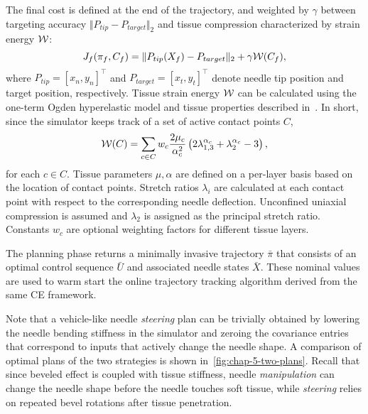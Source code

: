 The final cost is defined at the end of the trajectory, and weighted by $\gamma$ between targeting accuracy $\Vert P_{tip} - P_{target}\Vert_2$ and tissue compression characterized by strain energy $\mathcal{W}$:
\begin{equation}
  \label{eq:chap-5-plan-final-cost}
  J_{f}(\pi_f, C_f)= \Vert P_{tip}(X_f) - P_{target}\Vert_2 + \gamma\mathcal{W}(C_f),
\end{equation}
where $P_{tip} = [x_n, y_n]^{\top}$ and $P_{target} = [x_t, y_t]^{\top}$ denote needle tip position and target position, respectively. Tissue strain energy $\mathcal{W}$ can be calculated using the one-term Ogden hyperelastic model and tissue properties described in~\parencite{wangFlexibleNeedleBending2023}. In short, since the simulator keeps track of a set of active contact points $C$,
\begin{equation}
  \label{eq:chap-5-ogden}
  \mathcal{W}(C) = \sum_{c \in C}w_c \frac{2\mu_c}{\alpha_c^2}\left( 2\lambda_{1,3}^{\alpha_c} + \lambda_2^{\alpha_c} - 3 \right),
\end{equation}
for each $c \in C$. Tissue parameters $\mu, \alpha$ are defined on a per-layer basis based on the location of contact points. Stretch ratios $\lambda_i$ are calculated at each contact point with respect to the corresponding needle deflection. Unconfined uniaxial compression is assumed and $\lambda_2$ is assigned as the principal stretch ratio. Constants $w_c$ are optional weighting factors for different tissue layers. 

The planning phase returns a minimally invasive trajectory $\bar{\pi}$ that consists of an optimal control sequence $\bar{U}$ and associated needle states $\bar{X}$. These nominal values are used to warm start the online trajectory tracking algorithm derived from the same CE framework. 

Note that a vehicle-like needle \textit{steering} plan can be trivially obtained by lowering the needle bending stiffness in the simulator and zeroing the covariance entries that correspond to inputs that actively change the needle shape. A comparison of optimal plans of the two strategies is shown in~\cref{fig:chap-5-two-plans}. Recall that since beveled effect is coupled with tissue stiffness, needle \textit{manipulation} can change the needle shape before the needle touches soft tissue, while \textit{steering} relies on repeated bevel rotations after tissue penetration.

